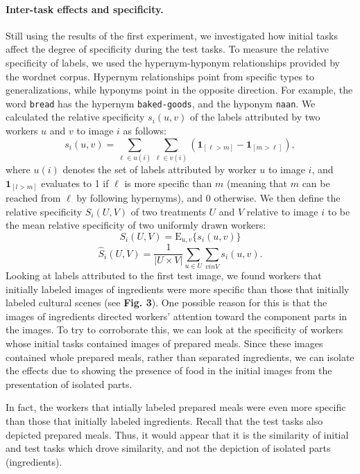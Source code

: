 \documentclass[12pt]{article}
\begin{document}
\paragraph{Inter-task effects and specificity.}
Still using the results of the first experiment, we investigated how initial 
tasks affect the degree of specificity during the test tasks.
To measure the relative specificity of labels, we used the hypernym-hyponym
relationships provided by the wordnet corpus.  Hypernym relationships point
from specific types to generalizations, while hyponyms point in the opposite
direction.  For example, the word \texttt{bread} has the hypernym 
\texttt{baked-goods}, and the hyponym \texttt{naan}.
We calculated the relative specificity $s_i(u,v)$ of the labels attributed by 
two workers $u$ and $v$ to image $i$ as follows:
$$
	s_i(u,v) = \sum_{\ell \in u(i)} \sum_{\ell \in v(i)} 
	\left( \mathbf{1}_{[\ell > m]} - \mathbf{1}_{[m>\ell]} \right),
$$
where $u(i)$ denotes the set of labels attributed by worker $u$ to image $i$, 
and $\mathbf{1}_{[l>m]}$ evaluates to 1 if $\ell$ is more specific than $m$
(meaning that $m$ can be reached from $\ell$ by following hypernyms), 
and 0 otherwise. We then define the relative specificity $S_i(U,V)$ of two 
treatments $U$ and $V$ relative to image $i$ to be the mean 
relative specificity of two uniformly drawn workers:
$$
S_i(U,V) = \mathrm{E}_{u,v}\{s_i(u,v)\}   
$$
$$
\hat{S}_i(U,V) = \frac{1}{|U \times V|} \sum_{u \in U} \sum_{v in V}
		s_i(u,v).
$$
Looking at labels attributed to the first test image, we found workers 
that initially labeled images of ingredients were more specific 
than those that initially labeled cultural scenes (see \textbf{Fig. 3}).  One 
possible reason for
this is that the images of ingredients directed workers' attention toward
the component parts in the images.  To try to corroborate this, we can look
at the specificity of workers whose initial tasks contained images of prepared
meals.  Since these images contained whole prepared meals, rather than 
separated ingredients, we can isolate the effects due to showing the presence
of food in the initial images from the presentation of isolated parts.  

In fact, the workers that intially labeled prepared meals were even
more specific than those that initially labeled ingredients.  Recall that the
test tasks also depicted prepared meals.  Thus, it would appear that it is 
the similarity of initial and test tasks which drove similarity, and not the
depiction of isolated parts (ingredients).
\end{document}

